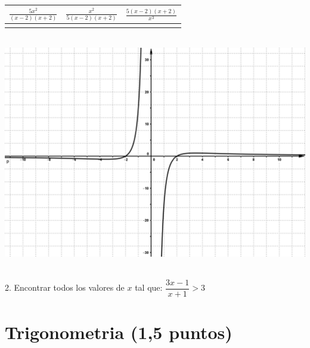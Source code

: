 \documentclass[a4paper,11pt,spanish,sans]{exam}
\newcommand{\Ts}{\rule{0pt}{2.8ex}}       %
\newcommand{\Bs}{\rule[-1.5ex]{0pt}{0pt}} %
\begin{document}
\begin{minipage}{.5\textwidth}
	\centering
	\begin{tabular}{|c|c|c|}
		\hline
		$\frac{5x^2}{(x-2)(x+2)}$  & $\frac{x^2}{5(x-2)(x+2)}$ & $\frac{5(x-2)(x+2)}{x^3}$ \Ts \Bs   \\ \hline
		&   &      \\ \hline
	\end{tabular}\\
	\centering
	\includegraphics[width= 0.95\linewidth]{integradora4.png}
\end{minipage}\\


2. Encontrar todos los valores de $x$ tal que: $\dfrac{3x-1}{x+1}>3$
\\

\section{Trigonometria (1,5 puntos)}
\end{document}
